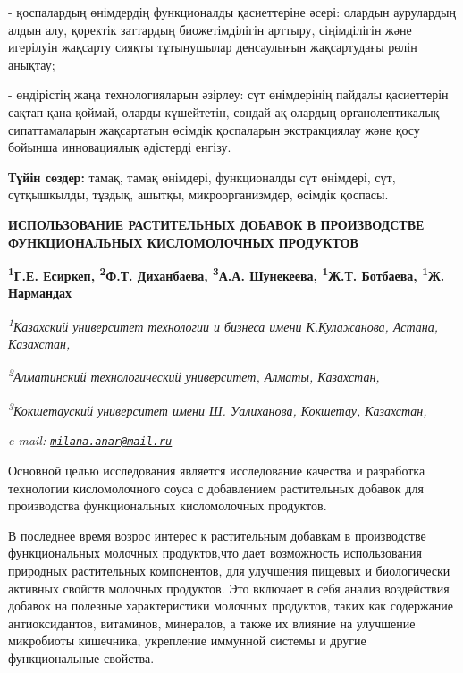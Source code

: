 - қоспалардың өнімдердің функционалды қасиеттеріне әсері: олардын
аурулардың алдын алу, қоректік заттардың биожетімділігін арттыру,
сіңімділігін және игерілуін жақсарту сияқты тұтынушылар денсаулығын
жақсартудағы рөлін анықтау;

- өндірістің жаңа технологияларын әзірлеу: сүт өнімдерінің пайдалы
қасиеттерін сақтап қана қоймай, оларды күшейтетін, сондай-ақ олардың
органолептикалық сипаттамаларын жақсартатын өсімдік қоспаларын
экстракциялау және қосу бойынша инновациялық әдістерді енгізу.

{\bfseries Түйін сөздер:} тамақ, тамақ өнімдері, функционалды сүт өнімдері,
сүт, сүтқышқылды, тұздық, ашытқы, микроорганизмдер, өсімдік қоспасы.

\begin{articleheader}
{\bfseries ИСПОЛЬЗОВАНИЕ РАСТИТЕЛЬНЫХ ДОБАВОК В ПРОИЗВОДСТВЕ ФУНКЦИОНАЛЬНЫХ КИСЛОМОЛОЧНЫХ ПРОДУКТОВ}

{\bfseries
\textsuperscript{1}Г.Е. Есиркеп\textsuperscript{\envelope },
\textsuperscript{2}Ф.Т. Диханбаева,
\textsuperscript{3}А.А. Шунекеева,
\textsuperscript{1}Ж.Т. Ботбаева,
\textsuperscript{1}Ж. Нармандах}
\end{articleheader}

\begin{affiliation}
\emph{\textsuperscript{1}Казахский университет технологии и бизнеса имени К.Кулажанова, Астана, Казахстан,}

\emph{\textsuperscript{2}Алматинский технологический университет, Алматы, Казахстан,}

\emph{\textsuperscript{3}Кокшетауский университет имени Ш. Уалиханова, Кокшетау, Казахстан,}

\emph{e-mail: \href{mailto:milana.anar@mail.ru}{\nolinkurl{milana.anar@mail.ru}}}
\end{affiliation}

Основной целью исследования является исследование качества и разработка
технологии кисломолочного соуса с добавлением растительных добавок для
производства функциональных кисломолочных продуктов.

В последнее время возрос интерес к растительным добавкам в производстве
функциональных молочных продуктов,что дает возможность использования
природных растительных компонентов, для улучшения пищевых и биологически
активных свойств молочных продуктов. Это включает в себя анализ
воздействия добавок на полезные характеристики молочных продуктов, таких
как содержание антиоксидантов, витаминов, минералов, а также их влияние
на улучшение микробиоты кишечника, укрепление иммунной системы и другие
функциональные свойства.

